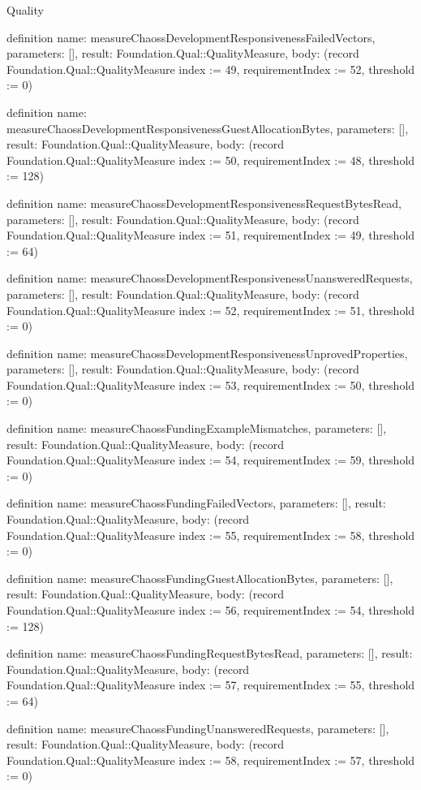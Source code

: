 \begin{lexlean}{Quality}
\begin{semanticmodule}
definition{
  name: measureChaossDevelopmentResponsivenessFailedVectors,
  parameters: [],
  result: Foundation.Qual::QualityMeasure,
  body: (record Foundation.Qual::QualityMeasure {index := 49, requirementIndex := 52, threshold := 0})
}

definition{
  name: measureChaossDevelopmentResponsivenessGuestAllocationBytes,
  parameters: [],
  result: Foundation.Qual::QualityMeasure,
  body: (record Foundation.Qual::QualityMeasure {index := 50, requirementIndex := 48, threshold := 128})
}

definition{
  name: measureChaossDevelopmentResponsivenessRequestBytesRead,
  parameters: [],
  result: Foundation.Qual::QualityMeasure,
  body: (record Foundation.Qual::QualityMeasure {index := 51, requirementIndex := 49, threshold := 64})
}

definition{
  name: measureChaossDevelopmentResponsivenessUnansweredRequests,
  parameters: [],
  result: Foundation.Qual::QualityMeasure,
  body: (record Foundation.Qual::QualityMeasure {index := 52, requirementIndex := 51, threshold := 0})
}

definition{
  name: measureChaossDevelopmentResponsivenessUnprovedProperties,
  parameters: [],
  result: Foundation.Qual::QualityMeasure,
  body: (record Foundation.Qual::QualityMeasure {index := 53, requirementIndex := 50, threshold := 0})
}

definition{
  name: measureChaossFundingExampleMismatches,
  parameters: [],
  result: Foundation.Qual::QualityMeasure,
  body: (record Foundation.Qual::QualityMeasure {index := 54, requirementIndex := 59, threshold := 0})
}

definition{
  name: measureChaossFundingFailedVectors,
  parameters: [],
  result: Foundation.Qual::QualityMeasure,
  body: (record Foundation.Qual::QualityMeasure {index := 55, requirementIndex := 58, threshold := 0})
}

definition{
  name: measureChaossFundingGuestAllocationBytes,
  parameters: [],
  result: Foundation.Qual::QualityMeasure,
  body: (record Foundation.Qual::QualityMeasure {index := 56, requirementIndex := 54, threshold := 128})
}

definition{
  name: measureChaossFundingRequestBytesRead,
  parameters: [],
  result: Foundation.Qual::QualityMeasure,
  body: (record Foundation.Qual::QualityMeasure {index := 57, requirementIndex := 55, threshold := 64})
}

definition{
  name: measureChaossFundingUnansweredRequests,
  parameters: [],
  result: Foundation.Qual::QualityMeasure,
  body: (record Foundation.Qual::QualityMeasure {index := 58, requirementIndex := 57, threshold := 0})
}


\end{semanticmodule}
\end{lexlean}

